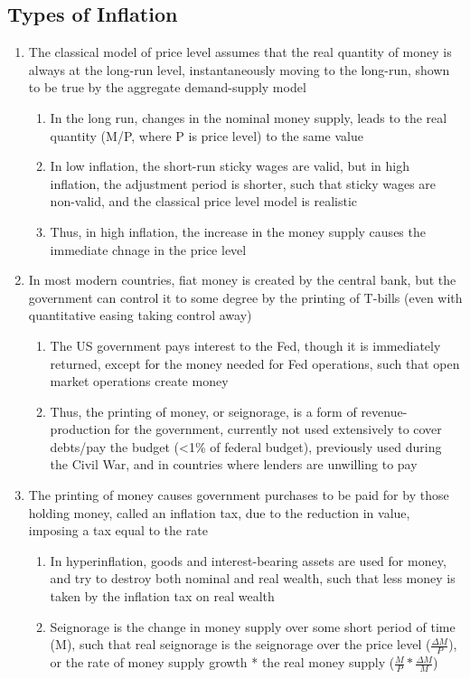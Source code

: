 \subsection{Types of Inflation}
\begin{enumerate}
\item The classical model of price level assumes that the real quantity of money is always at the long-run level, instantaneously moving to the long-run, shown to be true by the aggregate demand-supply model
\begin{enumerate}
\item In the long run, changes in the nominal money supply, leads to the real quantity (M/P, where P is price level) to the same value
\item In low inflation, the short-run sticky wages are valid, but in high inflation, the adjustment period is shorter, such that sticky wages are non-valid, and the classical price level model is realistic
\item Thus, in high inflation, the increase in the money supply causes the immediate chnage in the price level
\end{enumerate}
\item In most modern countries, fiat money is created by the central bank, but the government can control it to some degree by the printing of T-bills (even with quantitative easing taking control away)
\begin{enumerate}
\item The US government pays interest to the Fed, though it is immediately returned, except for the money needed for Fed operations, such that open market operations create money
\item Thus, the printing of money, or seignorage, is a form of revenue-production for the government, currently not used extensively to cover debts/pay the budget (<1\% of federal budget), previously used during the Civil War, and in countries where lenders are unwilling to pay
\end{enumerate}
\item The printing of money causes government purchases to be paid for by those holding money, called an inflation tax, due to the reduction in value, imposing a tax equal to the rate
\begin{enumerate}
\item In hyperinflation, goods and interest-bearing assets are used for money, and try to destroy both nominal and real wealth, such that less money is taken by the inflation tax on real wealth
\item Seignorage is the change in money supply over some short period of time (\Delta M), such that real seignorage is the seignorage over the price level ($\frac{\Delta M}{P}$), or the rate of money supply growth * the real money supply ($\frac{M}{P}*\frac{\Delta M}{M}$)

\end{enumerate}
\end{enumerate}
